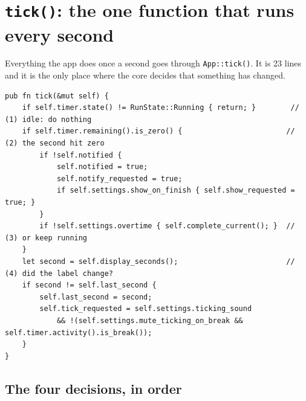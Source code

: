 \clearpage
\section{\texttt{tick()}: the one function that runs every second}

Everything the app does once a second goes through \texttt{App::tick()}. It is 23 lines
and it is the only place where the core decides that something has changed.

\begin{lstlisting}[caption={\file{app.rs} lines 133--155, complete.}]
pub fn tick(&mut self) {
    if self.timer.state() != RunState::Running { return; }        // (1) idle: do nothing
    if self.timer.remaining().is_zero() {                        // (2) the second hit zero
        if !self.notified {
            self.notified = true;
            self.notify_requested = true;
            if self.settings.show_on_finish { self.show_requested = true; }
        }
        if !self.settings.overtime { self.complete_current(); }  // (3) or keep running
    }
    let second = self.display_seconds();                         // (4) did the label change?
    if second != self.last_second {
        self.last_second = second;
        self.tick_requested = self.settings.ticking_sound
            && !(self.settings.mute_ticking_on_break && self.timer.activity().is_break());
    }
}
\end{lstlisting}

\subsection{The four decisions, in order}

